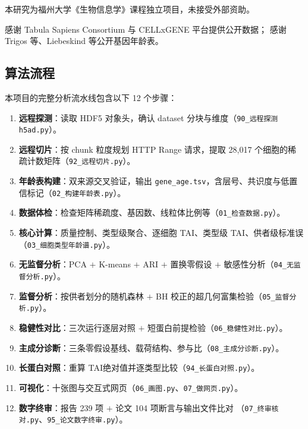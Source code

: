 \documentclass[numsec,webpdf,modern,large]{oup-authoring-template}
\newcommand{\tai}{\textrm{TAI}}
\newcommand{\code}[1]{\texttt{\small #1}}
\begin{document}
\vspace{0.35em}
本研究为福州大学《生物信息学》课程独立项目，未接受外部资助。

\vspace{0.35em}
感谢 Tabula Sapiens Consortium 与 CELLxGENE 平台提供公开数据；
感谢 Trigos 等、Liebeskind 等公开基因年龄表。





\begin{appendices}
\renewcommand{\thesection}{附录\,\Alph{section}}

\section{算法流程}

本项目的完整分析流水线包含以下 12 个步骤：

\begin{enumerate}[label=\textbf{S\arabic*.}, leftmargin=3.4em]
  \item \textbf{远程探测}：读取 HDF5 对象头，确认 dataset 分块与维度（\code{90\_远程探测h5ad.py}）。
  \item \textbf{远程切片}：按 chunk 粒度规划 HTTP Range 请求，提取 28,017 个细胞的稀疏计数矩阵（\code{92\_远程切片.py}）。
  \item \textbf{年龄表构建}：双来源交叉验证，输出 \code{gene\_age.tsv}，含层号、共识度与低置信标记（\code{02\_构建年龄表.py}）。
  \item \textbf{数据体检}：检查矩阵稀疏度、基因数、线粒体比例等（\code{01\_检查数据.py}）。
  \item \textbf{核心计算}：质量控制、类型级聚合、逐细胞 \tai、类型级 \tai、供者级标准误（\code{03\_细胞类型年龄谱.py}）。
  \item \textbf{无监督分析}：PCA $+$ K-means $+$ ARI $+$ 置换零假设 $+$ 敏感性分析（\code{04\_无监督分析.py}）。
  \item \textbf{监督分析}：按供者划分的随机森林 $+$ BH 校正的超几何富集检验（\code{05\_监督分析.py}）。
  \item \textbf{稳健性对比}：三次运行逐层对照 $+$ 短蛋白前提检验（\code{06\_稳健性对比.py}）。
  \item \textbf{主成分诊断}：三条零假设基线、载荷结构、参与比（\code{08\_主成分诊断.py}）。
  \item \textbf{长蛋白对照}：重算 \tai 绝对值并逐类型比较（\code{94\_长蛋白对照.py}）。
  \item \textbf{可视化}：十张图与交互式网页（\code{06\_画图.py}、\code{07\_做网页.py}）。
  \item \textbf{数字终审}：报告 239 项 $+$ 论文 104 项断言与输出文件比对
        （\code{07\_终审核对.py}、\code{95\_论文数字终审.py}）。
\end{enumerate}


\end{appendices}
\end{document}
